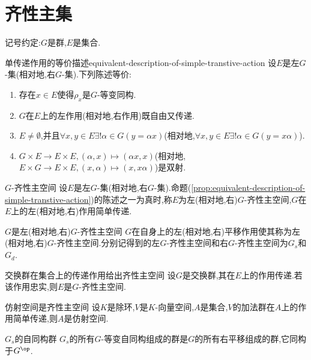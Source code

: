 \section{齐性主集}

记号约定:$G$是群,$E$是集合.

\begin{proposition}{单传递作用的等价描述}{equivalent-description-of-simple-transtive-action}
	设$E$是左$G$-集(相对地,右$G$-集).下列陈述等价:
	\begin{enumerate}
		\item 存在$x\in E$使得$\rho_{x}$是$G$-等变同构.
		\item $G$在$E$上的左作用(相对地,右作用)既自由又传递.
		\item $E\neq\emptyset$,并且$\forall x,y\in E\exists!\alpha\in G\left(y=\alpha x\right)$(相对地,$\forall x,y\in E\exists!\alpha\in G\left(y=x\alpha\right)$).
		\item $G\times E\to E\times E,\left(\alpha,x\right)\mapsto\left(\alpha x,x\right)$(相对地,$E\times G\to E\times E,\left(x,\alpha\right)\mapsto\left(x,x\alpha\right)$)是双射.
	\end{enumerate}
\end{proposition}

\begin{definition}{$G$-齐性主空间}{}
	设$E$是左$G$-集(相对地,右$G$-集).命题(\cref{prop:equivalent-description-of-simple-transtive-action})的陈述之一为真时,称$E$为左(相对地,右)$G$-齐性主空间,$G$在$E$上的左(相对地,右)作用简单传递.
\end{definition}

\begin{example}{$G$是左(相对地,右)$G$-齐性主空间}{}
	$G$在自身上的左(相对地,右)平移作用使其称为左(相对地,右)$G$-齐性主空间.分别记得到的左$G$-齐性主空间和右$G$-齐性主空间为$G_{s}$和$G_{d}$.
\end{example}

\begin{example}{交换群在集合上的传递作用给出齐性主空间}{}
	设$G$是交换群,其在$E$上的作用传递.若该作用忠实,则$E$是$G$-齐性主空间.
\end{example}

\begin{example}{仿射空间是齐性主空间}{}
	设$K$是除环,$V$是$K$-向量空间,$A$是集合,$V$的加法群在$A$上的作用简单传递,则$A$是仿射空间.
\end{example}

\begin{proposition}{$G_{s}$的自同构群}{}
	$G_{s}$的所有$G$-等变自同构组成的群是$G$的所有右平移组成的群,它同构于$G^{\op}$.
\end{proposition}

